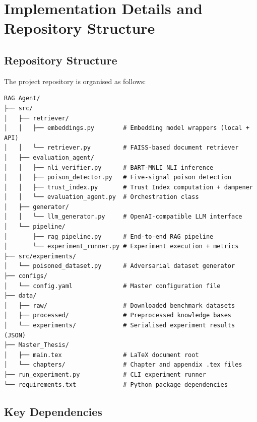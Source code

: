 \chapter{Implementation Details and Repository Structure}
\label{app:implementation}

\section{Repository Structure}

The project repository is organised as follows:

\begin{verbatim}
RAG Agent/
├── src/
│   ├── retriever/
│   │   ├── embeddings.py        # Embedding model wrappers (local + API)
│   │   └── retriever.py         # FAISS-based document retriever
│   ├── evaluation_agent/
│   │   ├── nli_verifier.py      # BART-MNLI NLI inference
│   │   ├── poison_detector.py   # Five-signal poison detection
│   │   ├── trust_index.py       # Trust Index computation + dampener
│   │   └── evaluation_agent.py  # Orchestration class
│   ├── generator/
│   │   └── llm_generator.py     # OpenAI-compatible LLM interface
│   └── pipeline/
│       ├── rag_pipeline.py      # End-to-end RAG pipeline
│       └── experiment_runner.py # Experiment execution + metrics
├── src/experiments/
│   └── poisoned_dataset.py      # Adversarial dataset generator
├── configs/
│   └── config.yaml              # Master configuration file
├── data/
│   ├── raw/                     # Downloaded benchmark datasets
│   ├── processed/               # Preprocessed knowledge bases
│   └── experiments/             # Serialised experiment results (JSON)
├── Master_Thesis/
│   ├── main.tex                 # LaTeX document root
│   └── chapters/                # Chapter and appendix .tex files
├── run_experiment.py            # CLI experiment runner
└── requirements.txt             # Python package dependencies
\end{verbatim}

\section{Key Dependencies}

